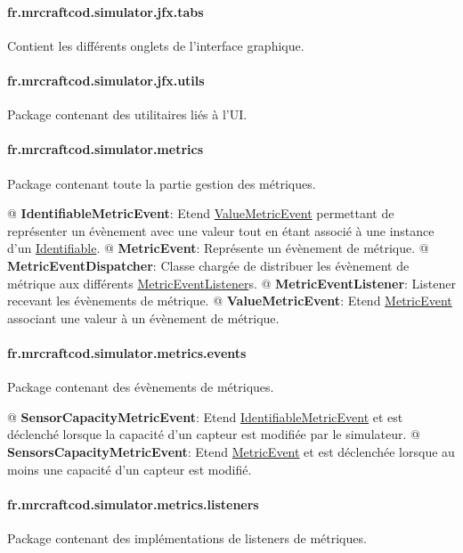 \documentclass[final]{polytech/polytech}
\newcommand{\class}[1]{\textbf{#1}\label{class:#1}}
\newcommand{\klass}[1]{\hyperref[class:#1]{#1}}
\begin{document}
			\paragraph{fr.mrcraftcod.simulator.jfx.tabs}
				Contient les différents onglets de l'interface graphique.

			\paragraph{fr.mrcraftcod.simulator.jfx.utils}
				Package contenant des utilitaires liés à l'UI.
				
			\paragraph{fr.mrcraftcod.simulator.metrics}
				Package contenant toute la partie gestion des métriques.
				
				\begin{easylist}
					@ \class{IdentifiableMetricEvent}: Etend \klass{ValueMetricEvent} permettant de représenter un évènement avec une valeur tout en étant associé à une instance d'un \klass{Identifiable}.
					@ \class{MetricEvent}: Représente un évènement de métrique.
					@ \class{MetricEventDispatcher}: Classe chargée de distribuer les évènement de métrique aux différents \klass{MetricEventListener}s.
					@ \class{MetricEventListener}: Listener recevant les évènements de métrique.
					@ \class{ValueMetricEvent}: Etend \klass{MetricEvent} associant une valeur à un évènement de métrique.
				\end{easylist}
				
			\paragraph{fr.mrcraftcod.simulator.metrics.events}
				Package contenant des évènements de métriques.
				
				\begin{easylist}
					@ \class{SensorCapacityMetricEvent}: Etend \klass{IdentifiableMetricEvent} et est déclenché lorsque la capacité d'un capteur est modifiée par le simulateur.
					@ \class{SensorsCapacityMetricEvent}: Etend \klass{MetricEvent} et est déclenchée lorsque au moins une capacité d'un capteur est modifié.
				\end{easylist}
				
			\paragraph{fr.mrcraftcod.simulator.metrics.listeners}
				Package contenant des implémentations de listeners de métriques.
				
\end{document}
